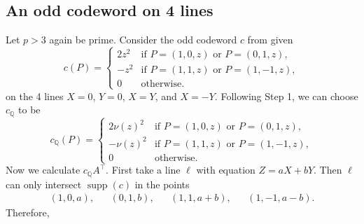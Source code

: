 \documentclass[12pt, a4paper]{article}
\theoremstyle{definition}
\newcommand{\QQ}{\mathbb Q}
\DeclareMathOperator{\supp}{supp}
\begin{document}
\subsection{An odd codeword on 4 lines}
 \label{Sec:4Lines}

Let $p > 3$ again be prime.
Consider the odd codeword $c$ from  given 
 \[
  c(P) = \begin{cases}
   2 z^2 & \text{if $P = (1,0,z)$ or $P=(0,1,z)$}, \\
   - z^2 & \text{if $P = (1,1,z)$ or $P = (1,-1,z)$}, \\
   0 & \text{otherwise}.
  \end{cases}
 \]
on the 4 lines $X=0$, $Y=0$, $X=Y$, and $X=-Y$.
Following Step 1, we can choose $c_\QQ$ to be
\[
 c_\QQ(P) = \begin{cases}
  2 \nu(z)^2 & \text{if } P = (1,0,z) \text{ or } P = (0,1,z), \\
  - \nu(z)^2 & \text{if } P = (1,1,z) \text{ or } P = (1,-1,z), \\
  0 & \text{otherwise.}
 \end{cases}
\]
Now we calculate $c_\QQ A^\top$.
First take a line $\ell$ with equation $Z = aX + bY$.
Then $\ell$ can only intersect $\supp(c)$ in the points
\begin{align*}
 (1,0,a), && (0,1,b), && (1,1,a+b), && (1,-1,a-b).
\end{align*}
Therefore,
\end{document}
